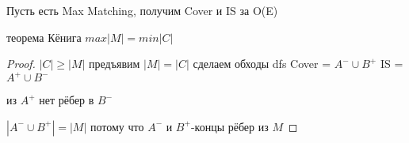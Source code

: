 Пусть есть Max Matching, получим Cover и IS за O(E)
\begin{theorem}{теорема Кёнига}
$max |M| = min |C|$
\end{theorem}
\begin{proof}
$|C| \ge |M|$
предъявим $|M| = |C|$
сделаем обходы dfs
Cover = $A^- \cup B^+$
IS = $A^+ \cup B^-$
\item из $A^+$ нет рёбер в $B^-$
\item $|A^- \cup B^+| = |M|$ потому что $A^-$ и $B^+$-концы рёбер из $M$
\end{proof}